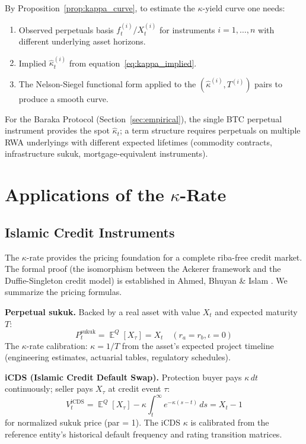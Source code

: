 \documentclass[10pt,twocolumn]{article}
\theoremstyle{plain}
\theoremstyle{definition}
\DeclareMathOperator{\E}{\mathbb{E}}
\begin{document}
By Proposition~\ref{prop:kappa_curve}, to estimate the
$\kappa$-yield curve one needs:
\begin{enumerate}[leftmargin=*,noitemsep]
\item Observed perpetuals basis $f_t^{(i)}/X_t^{(i)}$ for
instruments $i = 1,\ldots,n$ with different underlying asset
horizons.
\item Implied $\hat\kappa_t^{(i)}$ from equation~\eqref{eq:kappa_implied}.
\item The Nelson-Siegel \cite{NelsonSiegel1987} functional form
applied to the $(\hat\kappa^{(i)}, T^{(i)})$ pairs to produce
a smooth curve.
\end{enumerate}

For the Baraka Protocol (Section~\ref{sec:empirical}), the
single BTC perpetual instrument provides the spot
$\hat\kappa_t$; a term structure requires perpetuals on
multiple RWA underlyings with different expected lifetimes
(commodity contracts, infrastructure sukuk, mortgage-equivalent
instruments).

\section{Applications of the $\kappa$-Rate}
\label{sec:applications}

\subsection{Islamic Credit Instruments}
\label{sec:credit}

The $\kappa$-rate provides the pricing foundation for a complete
riba-free credit market. The formal proof (the isomorphism between
the Ackerer framework and the Duffie-Singleton credit model) is
established in Ahmed, Bhuyan \& Islam \cite{Ahmed2026b}. We
summarize the pricing formulas.

\textbf{Perpetual sukuk.} Backed by a real asset with value $X_t$
and expected maturity $T$:
\begin{equation}
P_t^{\text{sukuk}} = \E^Q[X_\tau] = X_t
\quad (r_a = r_b, \iota = 0)
\label{eq:sukuk}
\end{equation}
The $\kappa$-rate calibration: $\kappa = 1/T$ from the asset's
expected project timeline (engineering estimates, actuarial tables,
regulatory schedules).

\textbf{iCDS (Islamic Credit Default Swap).}
Protection buyer pays $\kappa\,dt$ continuously; seller pays
$X_\tau$ at credit event $\tau$:
\begin{equation}
V_t^{\text{iCDS}} = \E^Q[X_\tau] - \kappa\int_t^\infty
e^{-\kappa(s-t)}\,ds = X_t - 1
\label{eq:icds}
\end{equation}
for normalized sukuk price (par = 1). The iCDS $\kappa$ is
calibrated from the reference entity's historical default
frequency and rating transition matrices.
\end{document}
